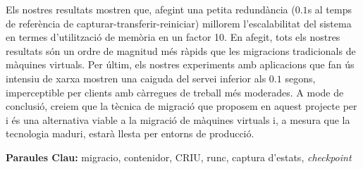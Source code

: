 Els nostres resultats mostren que, afegint una petita redund\`ancia ($0.1$s al temps de refer\`encia de capturar-transferir-reiniciar) millorem l'escalabilitat del sistema en termes d'utilitzaci\'o de mem\`oria en un factor 10.
En afegit, tots els nostres resultats s\'on un ordre de magnitud m\'es r\`apids que les migracions tradicionals de m\`aquines virtuals.
Per \'ultim, els nostres experiments amb aplicacions que fan \'us intensiu de xarxa mostren una caiguda del servei inferior als $0.1$ segons, imperceptible per clients amb c\`arregues de treball m\'es moderades.
A mode de conclusi\'o, creiem que la t\`ecnica de migraci\'o que proposem en aquest projecte per \criu i \runc \'es una alternativa viable a la migraci\'o de m\`aquines virtuals i, a mesura que la tecnologia maduri, estar\`a llesta per entorns de producci\'o.

\vspace{0.5cm}

\textbf{Paraules Clau:} migracio, contenidor, CRIU, runc, captura d'estats, \textit{checkpoint}

\vfill
